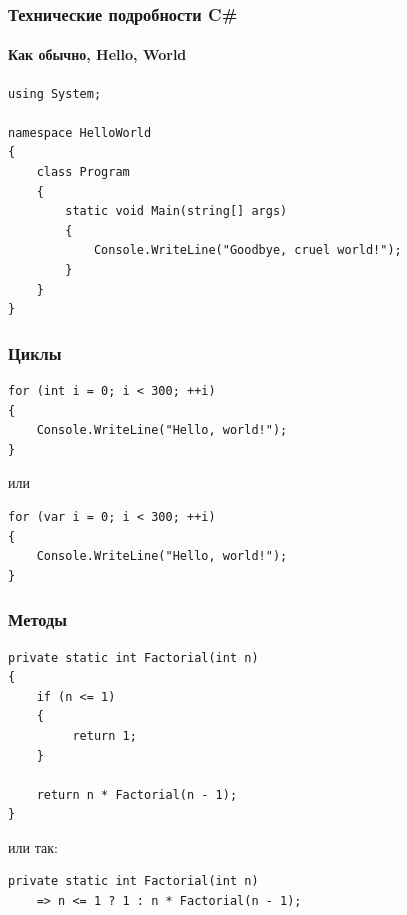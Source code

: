 \documentclass[xetex,mathserif,serif]{beamer}
\begin{document}
	\begin{frame}[fragile]
		\frametitle{Технические подробности C\#}
		\framesubtitle{Как обычно, Hello, World}
		\begin{verbatim}
using System;

namespace HelloWorld
{
    class Program
    {
        static void Main(string[] args)
        {
            Console.WriteLine("Goodbye, cruel world!");
        }
    }
}
		\end{verbatim}
\end{frame}

	\begin{frame}[fragile]
		\frametitle{Циклы}
		\begin{verbatim}
for (int i = 0; i < 300; ++i)
{
    Console.WriteLine("Hello, world!");
}
		\end{verbatim}
		или
		\begin{verbatim}
for (var i = 0; i < 300; ++i)
{
    Console.WriteLine("Hello, world!");
}
		\end{verbatim}
\end{frame}

	\begin{frame}[fragile]
		\frametitle{Методы}
		\begin{verbatim}
private static int Factorial(int n)
{
    if (n <= 1)
    {
         return 1;
    }

    return n * Factorial(n - 1);
}
		\end{verbatim}
		или так:
		\begin{verbatim}
private static int Factorial(int n) 
    => n <= 1 ? 1 : n * Factorial(n - 1);
		\end{verbatim}
\end{frame}

	\begin{frame}
		
	\end{frame}
\end{document}
